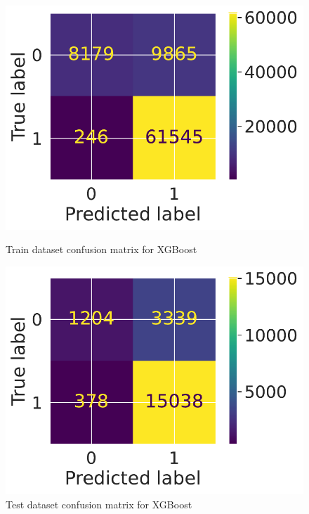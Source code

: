 \documentclass[12pt]{article}
\begin{document}
\begin{figure}
\centering
    \begin{minipage}{0.45\textwidth}
      \centering
      \includegraphics[width=.9\linewidth]{images/xboost_confusion_matrix_train.pdf}
      \caption{Train dataset confusion matrix for XGBoost}
      \label{fig:cm_xgboost_train}
    \end{minipage} \hfill
    \begin{minipage}{0.45\textwidth}
      \centering
      \includegraphics[width=.9\linewidth]{images/xboost_confusion_matrix_test.pdf}
      \caption{Test dataset confusion matrix for XGBoost}
      \label{fig:cm_xgboost_test}
    \end{minipage}
\end{figure}
\end{document}
